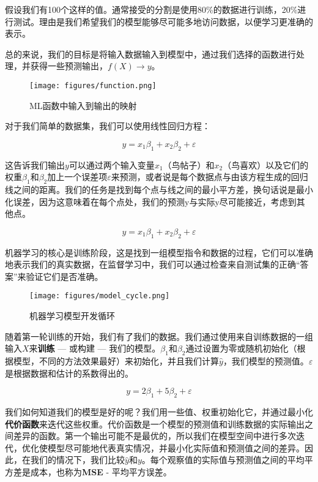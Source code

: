 \documentclass[Chinese, 11pt, table]{diazessay} %
\begin{document}
\begin{CJK}{UTF8}{gbsn}
\begin{sloppypar}
假设我们有100个这样的值。通常接受的分割是使用80\%的数据进行训练，20\%进行测试。理由是我们希望我们的模型能够尽可能多地访问数据，以便学习更准确的表示。

总的来说，我们的目标是将输入数据输入到模型中，通过我们选择的函数进行处理，并获得一些预测输出，$f(X) \rightarrow y$。

\begin{figure}[H]
  \texttt{[image: figures/function.png]}
  \caption{ML函数中输入到输出的映射 \citep{klein2013coding}}
\end{figure}

对于我们简单的数据集，我们可以使用线性回归方程：

\begin{equation}
y = x_1\beta_1 + x_2\beta_2 + \varepsilon
\end{equation}

这告诉我们输出$y$可以通过两个输入变量$x_1$（鸟帖子）和$x_2$（鸟喜欢）以及它们的权重$\beta_1$和$\beta_2$加上一个误差项$\varepsilon$来预测，或者说是每个数据点与由该方程生成的回归线之间的距离。我们的任务是找到每个点与线之间的最小平方差，换句话说是最小化误差，因为这意味着在每个点处，我们的预测y与实际y尽可能接近，考虑到其他点。

\begin{equation}
y = x_1\beta_1 + x_2\beta_2 + \varepsilon
\end{equation}

机器学习的核心是训练阶段，这是找到一组模型指令和数据的过程，它们可以准确地表示我们的真实数据，在监督学习中，我们可以通过检查来自测试集的正确“答案”来验证它们是否准确。

\begin{figure}[H]
  \texttt{[image: figures/model\_cycle.png]}
  \caption{机器学习模型开发循环}
\end{figure}

随着第一轮训练的开始，我们有了我们的数据。我们通过使用来自训练数据的一组输入$X$来\textbf{训练} --- 或构建 --- 我们的模型。$\beta_1$和$\beta_2$通过设置为零或随机初始化（根据模型，不同的方法效果最好）来初始化，并且我们计算$\hat{y}$，我们模型的预测值。$\varepsilon$是根据数据和估计的系数得出的。

\begin{equation}
y = 2\beta_1 + 5\beta_2 + \varepsilon
\end{equation}

我们如何知道我们的模型是好的呢？我们用一些值、权重初始化它，并通过最小化\textbf{代价函数}来迭代这些权重。代价函数是一个模型的预测值和训练数据的实际输出之间差异的函数。第一个输出可能不是最优的，所以我们在模型空间中进行多次迭代，优化使模型尽可能地代表真实情况，并最小化实际值和预测值之间的差异。因此，在我们的情况下，我们比较$\hat{y}$和$y$。每个观察值的实际值与预测值之间的平均平方差是成本，也称为\textbf{MSE} - 平均平方误差。


\end{sloppypar}
\end{CJK}
\end{document}
